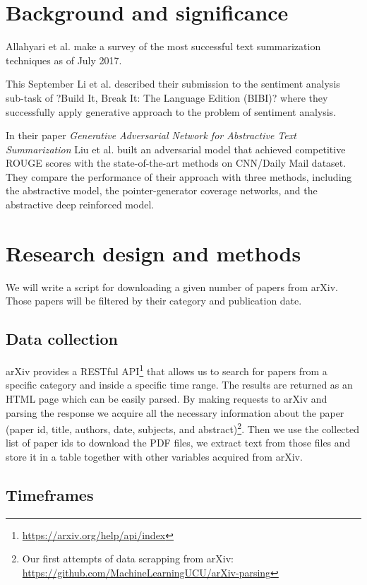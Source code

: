 \documentclass[sigplan]{acmart}
\begin{document}
\section{Background and significance}

Allahyari et al.\cite{allahyari-17} make a survey of the most successful text summarization techniques as of July 2017.

This September Li et al. \cite{li-cohn-17} described their submission to the sentiment analysis sub-task of ?Build It, Break It: The Language Edition (BIBI)? where they successfully apply generative approach to the problem of sentiment analysis.

In their paper \textit{Generative Adversarial Network for Abstractive Text Summarization} Liu et al.\cite{liu-17} built an adversarial model that achieved competitive ROUGE scores with the state-of-the-art methods on CNN/Daily Mail dataset. They compare the performance of their approach with three methods, including the abstractive model, the pointer-generator coverage networks, and the abstractive deep reinforced model.

\section{Research design and methods}

We will write a script for downloading a given number of papers from arXiv. Those papers will be filtered by their category and publication date.

\subsection{Data collection}

arXiv provides a RESTful API\footnote{\url{https://arxiv.org/help/api/index}} that allows us to search for papers from a specific category and inside a specific time range. The results are returned as an HTML page which can be easily parsed. By making requests to arXiv and parsing the response we acquire all the necessary information about the paper (paper id, title, authors, date, subjects, and abstract)\footnote{Our first attempts of data scrapping from arXiv:\\ \url{https://github.com/MachineLearningUCU/arXiv-parsing}}. Then we use the collected list of paper ids to download the PDF files, we extract text from those files and store it in a table together with other variables acquired from arXiv.

\subsection{Timeframes}
\end{document}

